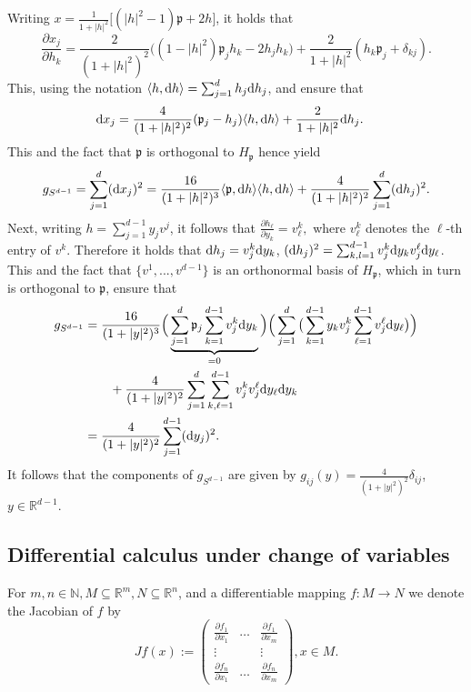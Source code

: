 \documentclass[12pt,a4paper, reqno]{amsart}
\theoremstyle{plain}
\theoremstyle{definition}
\theoremstyle{remark}
\numberwithin{equation}{section}
\newcommand{\1}{\mathbbm{1}}
\newcommand{\dd}{\textup{d}}
\newcommand{\R}{\ensuremath{\mathbb{R}}}
\newcommand{\N}{\ensuremath{\mathbb{N}}}
\begin{document}
Writing $x= \frac{1}{1+|h|^2}\big[ (|h|^2-1)\mathfrak{p}+2h\big]$, it holds  that 
\[ \frac{\partial  x_j}{\partial  h_k}=\frac{2}{(1+|h|^2)^2}\Big((1-|h|^2)\mathfrak{p}_jh_k -2h_jh_k\Big)+\frac{2}{1+|h|^2}(h_k \mathfrak{p}_j +\delta_{kj}).\]
This, using the notation $\langle h,\dd h\rangle = \sum_{j=1}^d h_j \dd h_j$, and \cite[Section 3.12]{Grigoryan2009_Book} ensure that
\[\begin{aligned}
    \dd x_j 
    &= \frac{4}{(1+|h|^2)^2}(\mathfrak{p}_j-h_j)\langle h,\dd h\rangle + \frac{2}{1+|h|^2}\dd h_j. 
\end{aligned}\]
This and the fact that $\mathfrak{p}$ is orthogonal to $H_\mathfrak{p}$ hence yield 
\[\begin{aligned}
    g_{S^{d-1}}&= \sum_{j=1}^d (\dd x_j)^2 
    =\frac{16}{(1+|h|^2)^3} \langle \mathfrak{p}, \dd h\rangle  \langle h,\dd h\rangle  +\frac{4}{(1+|h|^2)^2} \sum_{j=1}^d (\dd h_j)^2.\\
\end{aligned}\]
Next, writing $h = \sum_{j=1}^{d-1} y_j v^j$, it follows that $\frac{\partial h_\ell}{\partial y_k} = v^k_\ell,$
where $v^k_\ell$ denotes the $\ell$-th entry of $v^k$. Therefore it holds that $\dd h_j = v^k_j\dd y_k$, $(\dd h_j)^2= \sum_{k,l=1}^{d-1}v^k_j \dd y_k v^\ell_j \dd y_\ell$.
This and the fact that $\{v^1,...,v^{d-1}\}$ is an orthonormal basis of $H_\mathfrak{p}$, which in turn is orthogonal to $\mathfrak{p}$, ensure that
\[\begin{aligned}
    g_{S^{d-1}}
    &= \frac{16}{(1+|y|^2)^3}\Big(\underbrace{\sum_{j=1}^{d} \mathfrak{p}_j\sum_{k=1}^{d-1} v^k_j \dd y_k}_{=0}\Big)\Big( \sum_{j=1}^{d}\big(\sum_{k=1}^{d-1} y_k v^k_j\sum_{\ell=1}^{d-1} v^\ell_j \dd y_\ell\big)\Big) \\
    &\qquad + \frac{4}{(1+|y|^2)^2} \sum_{j=1}^{d}\sum_{k,\ell=1}^{d-1} v^k_j v^\ell_j \dd y_\ell \dd y_k\\
    &= \frac{4}{(1+|y|^2)^2} \sum_{j=1}^{d-1} (\dd y_j)^2.
\end{aligned}\]
It follows that the components of $g_{S^{d-1}}$ are given by $g_{ij}(y)= \frac{4}{(1+|y|^2)^2}\delta_{ij}$, $y\in \R^{d-1}$.
\subsection{Differential calculus under change of variables}
For $m,n\in \N, M\subseteq \R^m, N\subseteq \R^n$, and a differentiable mapping $f\colon M\rightarrow N$ we denote the Jacobian of $f$ by
\[J f(x):=\begin{pmatrix}
    \frac{\partial f_1}{\partial x_1}&\dots&\frac{\partial f_1}{\partial x_m}\\
    \vdots&&\vdots\\
    \frac{\partial f_n}{\partial x_1}&\dots&\frac{\partial f_n}{\partial x_m}
\end{pmatrix}, x\in M.\]
\end{document}
